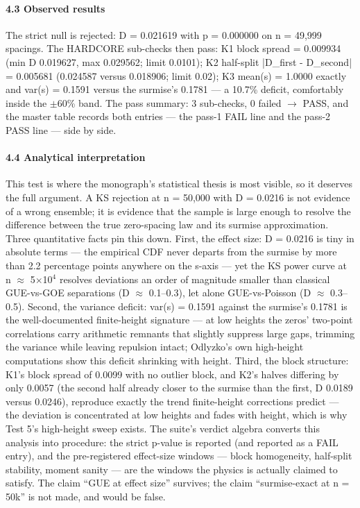 \documentclass[10pt]{article}
\begin{document}
\paragraph{4.3 Observed results}

The strict null is rejected: D = 0.021619 with p = 0.000000 on n = 49,999 spacings. The HARDCORE sub-checks then pass: K1 block spread = 0.009934 (min D 0.019627, max 0.029562; limit 0.0101); K2 half-split |D\_first - D\_second| = 0.005681 (0.024587 versus 0.018906; limit 0.02); K3 mean(s) = 1.0000 exactly and var(s) = 0.1591 versus the surmise's 0.1781 --- a 10.7\% deficit, comfortably inside the $\pm$60\% band. The pass summary: 3 sub-checks, 0 failed $\rightarrow$ PASS, and the master table records both entries --- the pass-1 FAIL line and the pass-2 PASS line --- side by side.

\paragraph{4.4 Analytical interpretation}

This test is where the monograph's statistical thesis is most visible, so it deserves the full argument. A KS rejection at n = 50,000 with D = 0.0216 is not evidence of a wrong ensemble; it is evidence that the sample is large enough to resolve the difference between the true zero-spacing law and its surmise approximation. Three quantitative facts pin this down. First, the effect size: D = 0.0216 is tiny in absolute terms --- the empirical CDF never departs from the surmise by more than 2.2 percentage points anywhere on the s-axis --- yet the KS power curve at n $\approx$ 5$\times$10$^4$ resolves deviations an order of magnitude smaller than classical GUE-vs-GOE separations (D $\approx$ 0.1--0.3), let alone GUE-vs-Poisson (D $\approx$ 0.3--0.5). Second, the variance deficit: var(s) = 0.1591 against the surmise's 0.1781 is the well-documented finite-height signature --- at low heights the zeros' two-point correlations carry arithmetic remnants that slightly suppress large gaps, trimming the variance while leaving repulsion intact; Odlyzko's own high-height computations show this deficit shrinking with height. Third, the block structure: K1's block spread of 0.0099 with no outlier block, and K2's halves differing by only 0.0057 (the second half already closer to the surmise than the first, D 0.0189 versus 0.0246), reproduce exactly the trend finite-height corrections predict --- the deviation is concentrated at low heights and fades with height, which is why Test 5's high-height sweep exists. The suite's verdict algebra converts this analysis into procedure: the strict p-value is reported (and reported as a FAIL entry), and the pre-registered effect-size windows --- block homogeneity, half-split stability, moment sanity --- are the windows the physics is actually claimed to satisfy. The claim ``GUE at effect size'' survives; the claim ``surmise-exact at n = 50k'' is not made, and would be false.
\end{document}
